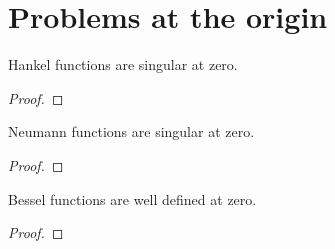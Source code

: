 \section{Problems at the origin}
%
  \begin{propn}
    Hankel functions are singular at zero.
  \end{propn}
  \begin{proof}

  \end{proof}
%
  \begin{propn}
    Neumann functions are singular at zero.
  \end{propn}
  \begin{proof}

  \end{proof}
%
  \begin{propn}
    Bessel functions are well defined at zero.
  \end{propn}
  \begin{proof}

  \end{proof}
%
